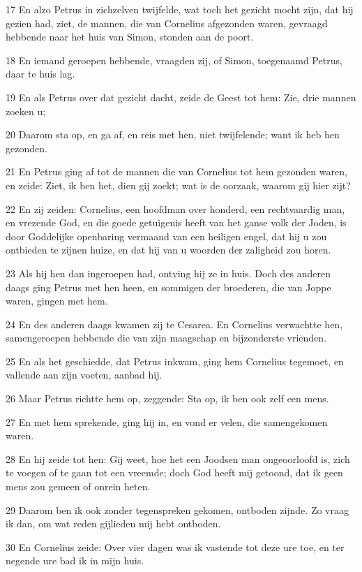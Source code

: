 \par 17 En alzo Petrus in zichzelven twijfelde, wat toch het gezicht mocht zijn, dat hij gezien had, ziet, de mannen, die van Cornelius afgezonden waren, gevraagd hebbende naar het huis van Simon, stonden aan de poort.
\par 18 En iemand geroepen hebbende, vraagden zij, of Simon, toegenaamd Petrus, daar te huis lag.
\par 19 En als Petrus over dat gezicht dacht, zeide de Geest tot hem: Zie, drie mannen zoeken u;
\par 20 Daarom sta op, en ga af, en reis met hen, niet twijfelende; want ik heb hen gezonden.
\par 21 En Petrus ging af tot de mannen die van Cornelius tot hem gezonden waren, en zeide: Ziet, ik ben het, dien gij zoekt; wat is de oorzaak, waarom gij hier zijt?
\par 22 En zij zeiden: Cornelius, een hoofdman over honderd, een rechtvaardig man, en vrezende God, en die goede getuigenis heeft van het ganse volk der Joden, is door Goddelijke openbaring vermaand van een heiligen engel, dat hij u zou ontbieden te zijnen huize, en dat hij van u woorden der zaligheid zou horen.
\par 23 Als hij hen dan ingeroepen had, ontving hij ze in huis. Doch des anderen daags ging Petrus met hen heen, en sommigen der broederen, die van Joppe waren, gingen met hem.
\par 24 En des anderen daags kwamen zij te Cesarea. En Cornelius verwachtte hen, samengeroepen hebbende die van zijn maagschap en bijzonderste vrienden.
\par 25 En als het geschiedde, dat Petrus inkwam, ging hem Cornelius tegemoet, en vallende aan zijn voeten, aanbad hij.
\par 26 Maar Petrus richtte hem op, zeggende: Sta op, ik ben ook zelf een mens.
\par 27 En met hem sprekende, ging hij in, en vond er velen, die samengekomen waren.
\par 28 En hij zeide tot hen: Gij weet, hoe het een Joodsen man ongeoorloofd is, zich te voegen of te gaan tot een vreemde; doch God heeft mij getoond, dat ik geen mens zou gemeen of onrein heten.
\par 29 Daarom ben ik ook zonder tegenspreken gekomen, ontboden zijnde. Zo vraag ik dan, om wat reden gijlieden mij hebt ontboden.
\par 30 En Cornelius zeide: Over vier dagen was ik vastende tot deze ure toe, en ter negende ure bad ik in mijn huis.
